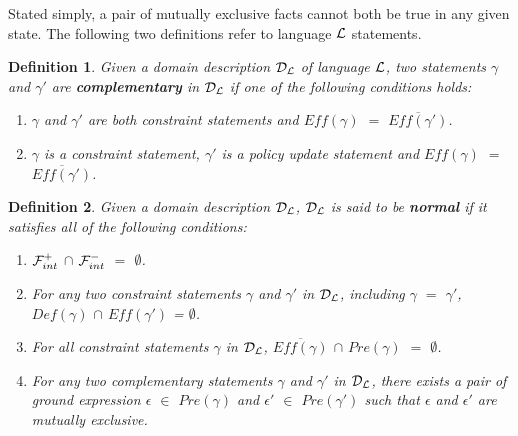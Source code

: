 \documentclass[11pt]{report}
\newtheorem{vdefinition}{Definition}[chapter]
\begin{document}
      Stated simply, a pair of mutually exclusive facts cannot both be true
      in any given state. The following two definitions refer to language
      ${\cal L}$ statements.

      \begin{vdefinition}
        \label{defn-langl-compl}
        Given a domain description ${\cal D_{L}}$ of language ${\cal L}$,
        two statements $\gamma$ and $\gamma'$ are {\bf complementary} in
        ${\cal D_{L}}$ if one of the following conditions holds:

        \begin{enumerate}
          \item
            $\gamma$ and $\gamma'$ are both constraint statements and
            $Eff(\gamma)$ $=$ $\overline{Eff(\gamma')}$.
          \item
            $\gamma$ is a constraint statement, $\gamma'$ is a policy update
            statement and $Eff(\gamma)$ $=$ $\overline{Eff(\gamma')}$.
        \end{enumerate}
      \end{vdefinition}

      \begin{vdefinition}
        \label{defn-langl-norml}
        Given a domain description ${\cal D_{L}}$, ${\cal D_{L}}$ is said to
        be {\bf normal} if it satisfies all of the following conditions:

        \begin{enumerate}
          \item
            \label{defn-langl-norml-1}
            ${\cal F}^{+}_{int}$ $\cap$ ${\cal F}^{-}_{int}$ $=$ $\emptyset$.
          \item
            \label{defn-langl-norml-2}
            For any two constraint statements $\gamma$ and $\gamma'$ in
            ${\cal D_{L}}$, including $\gamma$ $=$ $\gamma'$, $Def(\gamma)$
            $\cap$ $Eff(\gamma')$ = $\emptyset$.
          \item
            \label{defn-langl-norml-3}
            For all constraint statements $\gamma$ in ${\cal D_{L}}$,
            $\overline{Eff(\gamma)}$ $\cap$ $Pre(\gamma)$ $=$ $\emptyset$.
          \item
            \label{defn-langl-norml-4}
            For any two complementary statements $\gamma$ and $\gamma'$
            in ${\cal D_{L}}$, there exists a pair of ground expression
            $\epsilon$ $\in$ $Pre(\gamma)$ and $\epsilon'$ $\in$
            $Pre(\gamma')$ such that $\epsilon$ and $\epsilon'$ are
            mutually exclusive.
        \end{enumerate}
      \end{vdefinition}
\end{document}
